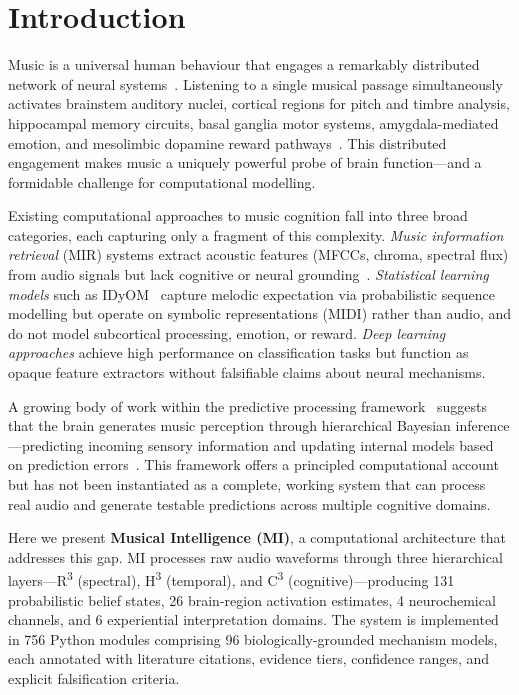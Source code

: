 \documentclass[twocolumn,10pt]{article}
\newcommand{\rthree}{R\textsuperscript{3}}
\newcommand{\hthree}{H\textsuperscript{3}}
\newcommand{\cthree}{C\textsuperscript{3}}
\begin{document}
\section{Introduction}

Music is a universal human behaviour that engages a remarkably distributed network of neural systems~\citep{peretz2005, zatorre2007}. Listening to a single musical passage simultaneously activates brainstem auditory nuclei, cortical regions for pitch and timbre analysis, hippocampal memory circuits, basal ganglia motor systems, amygdala-mediated emotion, and mesolimbic dopamine reward pathways~\citep{koelsch2014, salimpoor2011, zatorre2013}. This distributed engagement makes music a uniquely powerful probe of brain function---and a formidable challenge for computational modelling.

Existing computational approaches to music cognition fall into three broad categories, each capturing only a fragment of this complexity. \textit{Music information retrieval} (MIR) systems extract acoustic features (MFCCs, chroma, spectral flux) from audio signals but lack cognitive or neural grounding~\citep{muller2015, mcfee2015}. \textit{Statistical learning models} such as IDyOM~\citep{pearce2005, pearce2018} capture melodic expectation via probabilistic sequence modelling but operate on symbolic representations (MIDI) rather than audio, and do not model subcortical processing, emotion, or reward. \textit{Deep learning approaches} achieve high performance on classification tasks but function as opaque feature extractors without falsifiable claims about neural mechanisms.

A growing body of work within the predictive processing framework~\citep{friston2010, clark2013} suggests that the brain generates music perception through hierarchical Bayesian inference---predicting incoming sensory information and updating internal models based on prediction errors~\citep{koelsch2019, vuust2022}. This framework offers a principled computational account but has not been instantiated as a complete, working system that can process real audio and generate testable predictions across multiple cognitive domains.

Here we present \textbf{Musical Intelligence (MI)}, a computational architecture that addresses this gap. MI processes raw audio waveforms through three hierarchical layers---\rthree{} (spectral), \hthree{} (temporal), and \cthree{} (cognitive)---producing 131 probabilistic belief states, 26 brain-region activation estimates, 4 neurochemical channels, and 6 experiential interpretation domains. The system is implemented in 756 Python modules comprising 96 biologically-grounded mechanism models, each annotated with literature citations, evidence tiers, confidence ranges, and explicit falsification criteria.
\end{document}
